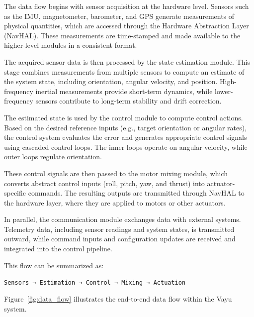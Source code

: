 The data flow begins with sensor acquisition at the hardware level. Sensors such as the IMU, magnetometer, barometer, and GPS generate measurements of physical quantities, which are accessed through the Hardware Abstraction Layer (NavHAL). These measurements are time-stamped and made available to the higher-level modules in a consistent format.

The acquired sensor data is then processed by the state estimation module. This stage combines measurements from multiple sensors to compute an estimate of the system state, including orientation, angular velocity, and position. High-frequency inertial measurements provide short-term dynamics, while lower-frequency sensors contribute to long-term stability and drift correction.

The estimated state is used by the control module to compute control actions. Based on the desired reference inputs (e.g., target orientation or angular rates), the control system evaluates the error and generates appropriate control signals using cascaded control loops. The inner loops operate on angular velocity, while outer loops regulate orientation.

These control signals are then passed to the motor mixing module, which converts abstract control inputs (roll, pitch, yaw, and thrust) into actuator-specific commands. The resulting outputs are transmitted through NavHAL to the hardware layer, where they are applied to motors or other actuators.

In parallel, the communication module exchanges data with external systems. Telemetry data, including sensor readings and system states, is transmitted outward, while command inputs and configuration updates are received and integrated into the control pipeline.

This flow can be summarized as:

\begin{center}
\texttt{Sensors → Estimation → Control → Mixing → Actuation}
\end{center}

Figure~\ref{fig:data_flow} illustrates the end-to-end data flow within the Vayu system.

